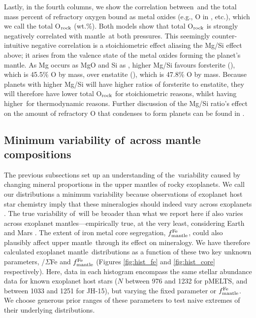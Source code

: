 Lastly, in the fourth columns, we show the correlation between \fo\,and the total mass percent of refractory oxygen bound as metal oxides (e.g., O in ,  etc.), which we call the total O$_{\rm rock}$ (wt.\%). Both models show that total O$_{\rm rock}$ is strongly negatively correlated with mantle \fo\,at both pressures. This seemingly counter-intuitive negative correlation is a stoichiometric effect aliasing the Mg/Si effect above; it arises from the valence state of the metal oxides forming the planet's mantle. As Mg occurs as MgO and Si as , higher Mg/Si favours forsterite (), which is 45.5\% O by mass, over enstatite (), which is 47.8\% O by mass. Because planets with higher Mg/Si will have higher ratios of forsterite to enstatite, they will therefore have lower total O$_{\rm rock}$ for stoichiometric reasons, whilst having higher \fo\,for thermodynamic reasons. Further discussion of the Mg/Si ratio's effect on the amount of refractory O that condenses to form planets can be found in \citet{unterborn_effects_2017}.



\subsection{Minimum variability of \fo\,across mantle compositions}



The previous subsections set up an understanding of the \fo\,variability caused by changing mineral proportions in the upper mantles of rocky exoplanets. We call our distributions a minimum variability because observations of exoplanet host star chemistry imply that these mineralogies should indeed vary across exoplanets \citep{hinkel_stellar_2014, putirka_composition_2019}. The true variability of \fo\,will be broader than what we report here if \xfer\;also varies across exoplanet mantles---empirically true, at the very least,  considering Earth and Mars \citep[e.g.,][]{dale_late_2012}. The extent of iron metal core segregation, $f^{\rm Fe}_{\rm mantle}$, could also plausibly affect upper mantle \fo\,through its effect on mineralogy. We have therefore calculated exoplanet mantle \fo\,distributions as a function of these two key unknown parameters, /$\Sigma$Fe and $f^{\rm Fe}_{\rm mantle}$ (Figures \ref{fig:hist_fe} and \ref{fig:hist_core} respectively). Here, data in each histogram encompass the same stellar abundance data for known exoplanet host stars ($N$ between 976 and 1232 for pMELTS, and between 1033 and 1251 for JH-15), but varying the fixed parameter \xfer\;or $f^{\rm Fe}_{\rm mantle}$. We choose generous prior ranges of these parameters to test naive extremes of their underlying distributions.


